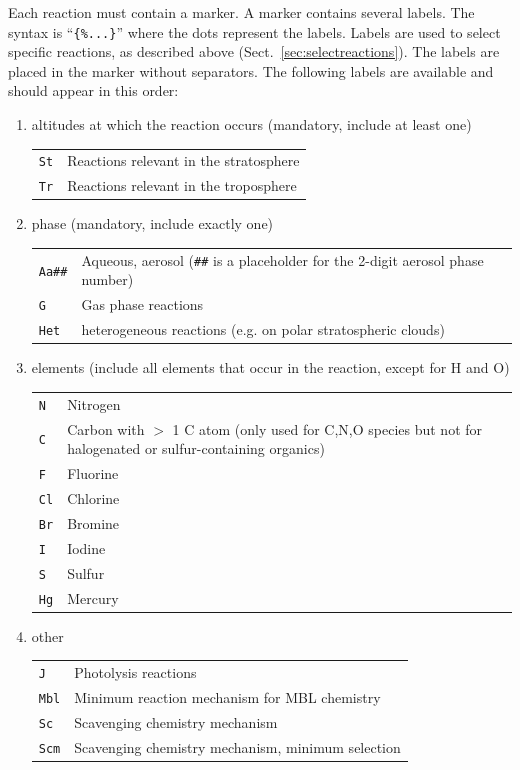 \documentclass[twoside]{article}
\begin{document}
Each reaction must contain a marker. A marker contains several labels.
The syntax is ``\verb|{%...}|'' where the dots represent the
  labels. Labels are used to select specific reactions, as described
  above (Sect.~\ref{sec:selectreactions}). The labels are placed in the
  marker without separators. The following labels are available and
  should appear in this order:
\begin{enumerate}
\item altitudes at which the reaction occurs (mandatory, include at
  least one)\\
  \begin{tabular}{l@{ = }p{}}
  \verb|St|   & Reactions relevant in the stratosphere\\
  \verb|Tr|   & Reactions relevant in the troposphere
  \end{tabular}
\item phase (mandatory, include exactly one)\\
  \begin{tabular}{l@{ = }p{}}
    \verb|Aa##| & Aqueous, aerosol (\verb|##| is a placeholder for the
    2-digit aerosol phase number)\\
    \verb|G|    & Gas phase reactions\\
    \verb|Het|  & heterogeneous reactions (e.g. on polar stratospheric
                  clouds)\\ 
  \end{tabular}
\item elements (include all elements that occur in the reaction, except
  for H and O)\\
  \begin{tabular}{l@{ = }p{}}
  \verb|N|    & Nitrogen\\
  \verb|C|    & Carbon with $>$ 1 C atom (only used for C,N,O species but
                not for halogenated or sulfur-containing organics)\\
  \verb|F|    & Fluorine\\
  \verb|Cl|   & Chlorine\\
  \verb|Br|   & Bromine\\
  \verb|I|    & Iodine\\
  \verb|S|    & Sulfur\\
  \verb|Hg|   & Mercury
  \end{tabular}
\item other\\
  \begin{tabular}{l@{ = }p{}}
  \verb|J|    & Photolysis reactions\\
  \verb|Mbl|  & Minimum reaction mechanism for MBL chemistry\\
  \verb|Sc|   & Scavenging chemistry mechanism\\
  \verb|Scm|  & Scavenging chemistry mechanism, minimum selection
  \end{tabular}
\end{enumerate}
\end{document}
